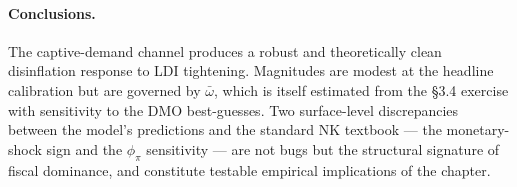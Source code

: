 \documentclass[11pt,a4paper]{article}
\begin{document}
\paragraph{Conclusions.} The captive-demand channel produces a robust and theoretically clean disinflation response to LDI tightening. Magnitudes are modest at the headline calibration but are governed by $\bar\omega$, which is itself estimated from the §3.4 exercise with sensitivity to the DMO best-guesses. Two surface-level discrepancies between the model's predictions and the standard NK textbook --- the monetary-shock sign and the $\phi_\pi$ sensitivity --- are not bugs but the structural signature of fiscal dominance, and constitute testable empirical implications of the chapter.
\end{document}
